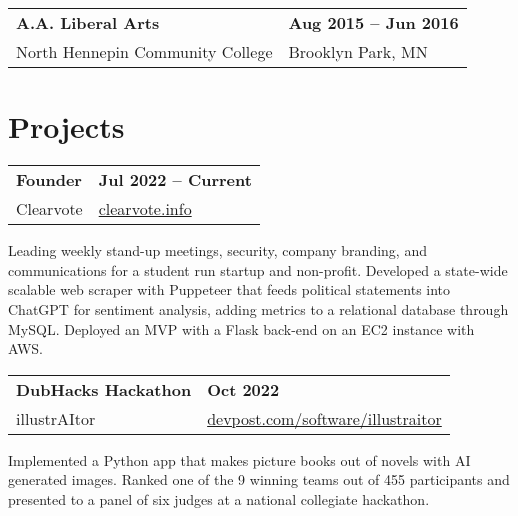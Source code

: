 \documentclass[11pt,letterpaper]{article}
\begin{document}
\begin{tabularx}{\textwidth}{lX}
    \textbf{A.A. Liberal Arts} & \hfill \textbf{Aug 2015 -- Jun 2016} \\[0pt]
    \small North Hennepin Community College & \hfill Brooklyn Park, MN \\
\end{tabularx}


\section{Projects}

\begin{tabularx}{\textwidth}{lX}
    \textbf{Founder} & \hfill \textbf{Jul 2022 -- Current} \\[0pt]
    \small Clearvote & \hfill \href{https://github.com/jkru3/ClearVote}{clearvote.info} \\
\end{tabularx}
\begin{itemize}
    \small Leading weekly stand-up meetings, security, company branding, and communications for a student run startup and non-profit. Developed a state-wide scalable web scraper with Puppeteer that feeds political statements into ChatGPT for sentiment analysis, adding metrics to a relational database through MySQL. Deployed an MVP with a Flask back-end on an EC2 instance with AWS.
\end{itemize}

\begin{tabularx}{\textwidth}{lX}
    \textbf{DubHacks Hackathon} & \hfill \textbf{Oct 2022} \\[0pt]
    \small illustrAItor & \hfill \href{https://devpost.com/software/illustraitor}{devpost.com/software/illustraitor} \\
\end{tabularx}
\begin{itemize}
    \small Implemented a Python app that makes picture books out of novels with AI generated images. Ranked one of the 9 winning teams out of 455 participants and presented to a panel of six judges at a national collegiate hackathon.
\end{itemize}
\end{document}
